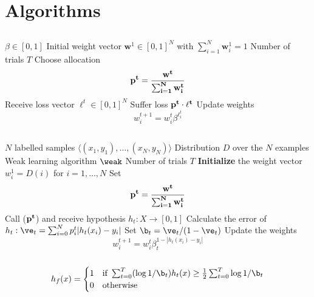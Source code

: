 
\chapter{Algorithms}
\label{app:algo}

\section{\hedge}
\label{app:hedge}

\begin{algorithm}
\caption{\hedge}
\begin{algorithmic}[1]
\Require 
\Statex $\beta\in [0,1]$
\Statex Initial weight vector $\mathbf{w}^1\in [0,1]^N$ with $\sum_{i=1}^N \mathbf{w}^1_i=1$
\Statex Number of trials $T$
\State Choose allocation $$\bf p^t= \frac{\bf w^t}{\sum_{i=1}^N \mathbf{w}^t_i}$$
\State Receive loss vector $\ell^t\in[0,1]^N$
\State Suffer loss $\bf p^t\cdot \ell^t$
\State Update weights $$w^{t+1}_i=w^t_i\beta^{\ell_{i}^{t}}$$
\EndFor
\EndProcedure
\end{algorithmic}
\end{algorithm}
\newpage
\section{\adaB}
\label{app:adaB}

\begin{algorithm} 
\caption{\adaB}
\begin{algorithmic}[1]
\Require 
\Statex $N$ labelled samples $\langle (x_1,y_1),\ldots,(x_N,y_N)\rangle$
\Statex Distribution $D$ over the $N$ examples
\Statex Weak learning algorithm $\weak$
\Statex Number of trials $T$
\State \textbf{Initialize} the weight vector $w_i^1=D(i)$ for $i=1,\ldots,N$
\State Set $$\bf p^t= \frac{\bf w^t}{\sum_{i=1}^N \mathbf{w}^t_i}$$
\State Call \weak($\bf p^t$) and receive hypothesis $h_t:X\to [0,1]$
\State Calculate the error of $h_t:\ve_t=\sum^N_{i=0}p^t_i|h_t(x_i)-y_i|$
\State Set $\b_t=\ve_t/(1-\ve_t)$
\State Update the weights $$w^{t+1}_i=w^t_i\beta^{1-|h_t(x_i)-y_i|}_t$$
\EndFor\\
\Return $$h_f(x)=\begin{cases}1 & \text{if } \sum^T_{t=0}(\log1/\b_t)h_t(x)\geq\frac12\sum^T_{t=0}\log1/\b_t\\0&\text{otherwise}\end{cases}$$
\EndProcedure
\end{algorithmic}
\end{algorithm}